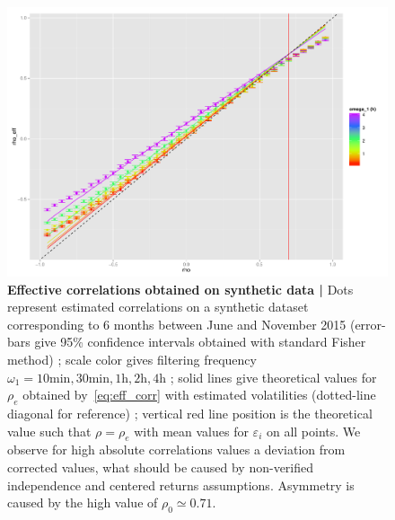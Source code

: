 \begin{figure}[h!]
\centering
\includegraphics[width=\textwidth]{Figures/SyntheticData/effectiveCorrs_withGoodTh_A4}
\caption[Effective correlations obtained on synthetic data]{\small\textbf{Effective correlations obtained on synthetic data | } Dots represent estimated correlations on a synthetic dataset corresponding to 6 months between June and November 2015 (error-bars give 95\% confidence intervals obtained with standard Fisher method) ; scale color gives filtering frequency $\omega_1=10\textrm{min},30\textrm{min},1\textrm{h},2\textrm{h},4\textrm{h}$ ; solid lines give theoretical values for $\rho_e$ obtained by~\ref{eq:eff_corr} with estimated volatilities (dotted-line diagonal for reference) ; vertical red line position is the theoretical value such that $\rho = \rho_e$ with mean values for $\varepsilon_i$ on all points. We observe for high absolute correlations values a deviation from corrected values, what should be caused by non-verified independence and centered returns assumptions. Asymmetry is caused by the high value of $\rho_0 \simeq 0.71$.}
\label{fig:effective_corrs}
\end{figure}


